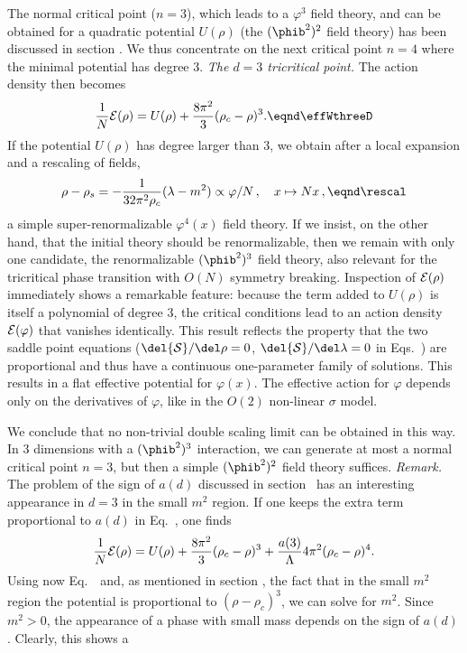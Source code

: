 The normal critical point ($n=3$), which leads to a $\varphi^3$ field theory,
and can be obtained for a quadratic potential $U(\rho)$  (the $(\phib^2)^2$ field theory)
has been discussed in section \ssfivNi. We thus concentrate on the next critical
point $n=4$ where the minimal potential has degree 3.
\medskip %
{\it The $d=3$ tricritical point.}
The action density  then becomes
$${1\over N}{\cal E}(\rho)= U(\rho)+ \frac{8\pi^2}{3}(\rho_c-\rho)^3. \eqnd\effWthreeD$$
If the potential $U(\rho)$ has degree larger than 3, we obtain
after a local expansion and a rescaling of fields,
$$\rho-\rho_s= -{ 1\over 32\pi^2 \rho_c}
(\lambda-m^2)\propto \varphi/N\,,\quad x\mapsto Nx\,,\eqnd\rescal$$
a simple super-renormalizable $\varphi^4(x)$ field theory.
If we insist,
on the other hand, that the initial theory should be renormalizable, then we remain with
only one candidate, the renormalizable $(\phib^2)^3$ field theory, also
relevant for the tricritical phase transition with $O(N)$ symmetry breaking.
Inspection of  $ {\cal E}(\rho)$ immediately shows a remarkable feature:
because the term added to $U(\rho)$ is itself a polynomial of degree 3,
the critical conditions lead to an action density $ {\cal E}(\varphi)$ that vanishes identically. This result reflects the property that
the two saddle point equations  ($\del {\cal S}/\del \rho = 0$, $
\del {\cal S}/\del \lambda = 0$ in Eqs.~\esaddNgen{}) are proportional
and thus have a continuous one-parameter family of solutions. This results in
a flat effective potential for $\varphi(x)$.
The effective action for $\varphi$ depends only on the derivatives
of $\varphi$, like in the $O(2)$ non-linear $\sigma$ model. \par
We conclude that no non-trivial double scaling limit can be obtained in this way.
In 3 dimensions with a $(\phib^2)^3$ interaction, we can generate at
most a normal critical point $n=3$, but then a simple $(\phib^2)^2$
field theory suffices.
\smallskip
{\it Remark.} The problem of the sign of $a(d)$ discussed in section \smulticr\ has an interesting appearance in $d= 3$ in the small $m^2$ region.
If one keeps the
extra term proportional to $a(d)$ in Eq.~\effUrho, one finds
$${1\over N}{\cal E}(\rho)=U(\rho)+{8\pi^2 \over 3}(\rho_c-\rho)^3
+{a(3)\over\Lambda} 4\pi^2 (\rho_c-\rho)^4.$$
Using now Eq.~\erholambda\ and, as mentioned in section \sboundst,
the fact that in the small $m^2$ region the potential is proportional to
$(\rho-\rho_c)^3$, we can solve for $m^2$.
Since $m^2>0$, the appearance of a phase with small mass depends
on the sign of $a(d)$. Clearly, this shows a
